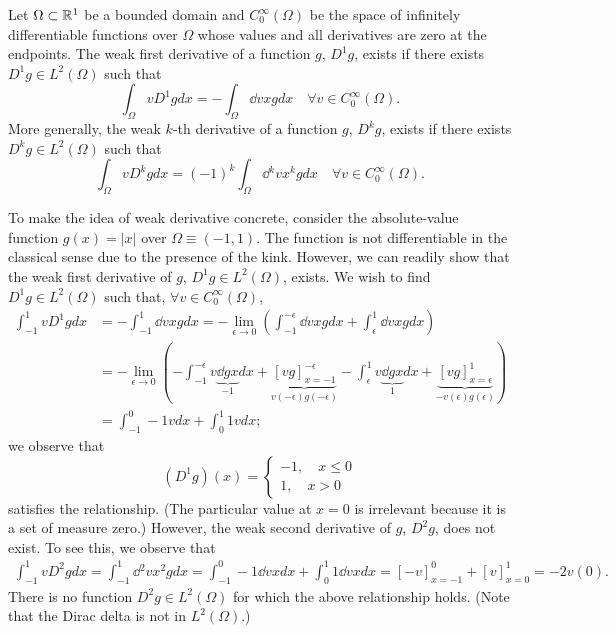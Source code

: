 \begin{definition}
  Let $\Omega \subset \mathbb{R}^1$ be a bounded domain and $C^\infty_0(\Omega)$ be the space of infinitely differentiable functions over $\Omega$ whose values and all derivatives are zero at the endpoints. The weak first derivative of a function $g$, $D^1g$, exists if there exists $D^1g \in L^2(\Omega)$ such that
\begin{equation*}
  \int_\Omega v D^1 g dx = - \int_\Omega \dd{v}{x} g dx \quad \forall v \in C^\infty_0(\Omega).
\end{equation*}
More generally, the weak $k$-th derivative of a function $g$, $D^kg$, exists if there exists $D^kg \in L^2(\Omega)$ such that
\begin{equation*}
  \int_\Omega v D^k g dx = (-1)^k \int_\Omega \dd{^kv}{x^k} g dx \quad \forall v \in C^\infty_0(\Omega).
\end{equation*}
\end{definition}

To make the idea of weak derivative concrete, consider the absolute-value function $g(x) = |x|$ over $\Omega \equiv (-1,1)$.  The function is not differentiable in the classical sense due to the presence of the kink.  However, we can readily show that the weak first derivative of $g$, $D^1g \in L^2(\Omega)$, exists.  We wish to find $D^1 g \in L^2(\Omega)$ such that, $\forall v \in C^\infty_0(\Omega)$, 
\begin{align*}
  \int_{-1}^1 v D^1 g dx
  &=
  - \int_{-1}^1 \dd{v}{x} g dx
  =
  - \lim_{\epsilon \to 0} ( \int_{-1}^{-\epsilon} \dd{v}{x} g dx
  + \int_{\epsilon}^1 \dd{v}{x} g dx )
  \\
  &=
  - \lim_{\epsilon \to 0} (-\int_{-1}^{-\epsilon} v \underbrace{ \dd{g}{x} }_{-1}dx + \underbrace{[vg]_{x=-1}^{-\epsilon}}_{v(-\epsilon)g(-\epsilon)}
  - \int_{\epsilon}^1 v \underbrace{ \dd{g}{x} }_{1} dx + \underbrace{[vg]_{x=\epsilon}^1}_{-v(\epsilon)g(\epsilon)} )
  \\
  &=
   \int_{-1}^{0} -1 v  dx +  \int_{0}^1 1 v dx;  %
\end{align*}
we observe that 
\begin{equation*}
  (D^1 g)(x) = \begin{cases}
    -1, \quad x \leq 0 \\
    1, \quad x > 0
  \end{cases}
\end{equation*}
satisfies the relationship. (The particular value at $x = 0$ is irrelevant because it is a set of measure zero.) However, the weak second derivative of $g$, $D^2g$, does not exist. To see this, we observe that
\begin{align*}
  \int_{-1}^1 v D^2 g dx
  =
  \int_{-1}^1 \dd{^2v}{x^2} g dx
  =
  \int_{-1}^0 -1 \dd{v}{x} dx + \int_{0}^1 1 \dd{v}{x} dx
  =
  [-v]_{x=-1}^0 + [v]_{x=0}^1
  =
  -2v(0).
\end{align*}
There is no function $D^2g \in L^2(\Omega)$ for which the above relationship holds.  (Note that the Dirac delta is not in $L^2(\Omega)$.)  %

